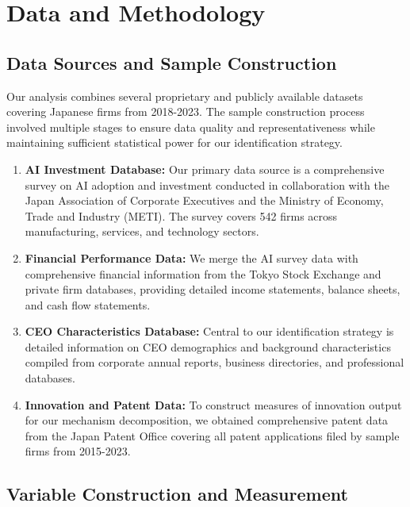 \documentclass[12pt]{article}
\begin{document}
\section{Data and Methodology}

\subsection{Data Sources and Sample Construction}

Our analysis combines several proprietary and publicly available datasets covering Japanese firms from 2018-2023. The sample construction process involved multiple stages to ensure data quality and representativeness while maintaining sufficient statistical power for our identification strategy.

\begin{enumerate}
\item \textbf{AI Investment Database:} Our primary data source is a comprehensive survey on AI adoption and investment conducted in collaboration with the Japan Association of Corporate Executives and the Ministry of Economy, Trade and Industry (METI). The survey covers 542 firms across manufacturing, services, and technology sectors.

\item \textbf{Financial Performance Data:} We merge the AI survey data with comprehensive financial information from the Tokyo Stock Exchange and private firm databases, providing detailed income statements, balance sheets, and cash flow statements.

\item \textbf{CEO Characteristics Database:} Central to our identification strategy is detailed information on CEO demographics and background characteristics compiled from corporate annual reports, business directories, and professional databases.

\item \textbf{Innovation and Patent Data:} To construct measures of innovation output for our mechanism decomposition, we obtained comprehensive patent data from the Japan Patent Office covering all patent applications filed by sample firms from 2015-2023.
\end{enumerate}

\subsection{Variable Construction and Measurement}
\end{document}
